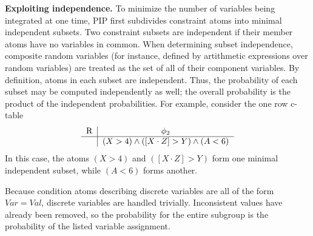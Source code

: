 

{\bf Exploiting independence.}
To minimize the number of variables being integrated at one time, PIP first subdivides constraint atoms into minimal independent subsets.  Two constraint subsets are independent if their member atoms have no variables in common.  When determining subset independence, composite random variables (for instance, defined by artithmetic expressions over random variables) are treated as the set of all of their component variables.  By definition, atoms in each subset are independent.  Thus, the probability of each subset may be computed independently as well; the overall probability is the product of the independent probabilities.  For example, consider the one row c-table 
\[
\begin{tabular}{c|c}
R & $\phi_2$ \\
\hline
& $(X > 4) \wedge ([X\cdot Z] > Y) \wedge (A < 6)$ \\
\end{tabular}
\]
In this case, the atoms $(X > 4)$ and $([X\cdot Z] > Y)$ form one minimal independent subset, while $(A < 6)$ forms another.

Because condition atoms describing discrete variables are all of the form $Var = Val$, discrete variables are handled trivially.  Inconsistent values have already been removed, so the probability for the entire subgroup is the probability of the listed variable assignment.

